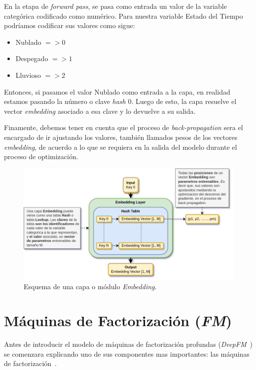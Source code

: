 \documentclass[11pt,a4paper,twoside]{thesis}
\begin{document}
\clearpage

En la etapa de \textit{forward pass}, se pasa como entrada un valor de la
variable categórica codificado como numérico. Para nuestra variable Estado del
Tiempo podríamos codificar sus valores como sigue:

\begin{itemize}
	\item Nublado $=> 0$
	\item Despegado $=> 1$
	\item Lluvioso $=> 2$
\end{itemize}

Entonces, si pasamos el valor Nublado como entrada a la capa, en realidad
estamos pasando la número o clave \textit{hash} $0$. Luego de esto, la capa
resuelve el vector \textit{embedding} asociado a esa clave y lo devuelve a su
salida.

Finamente, debemos tener en cuenta que el proceso de \textit{back-propagation}
sera el encargado de ir ajustando los valores, también llamados pesos de los
vectores \textit{embedding}, de acuerdo a lo que se requiera en la salida del
modelo durante el proceso de optimización.

\begin{figure}[ht!]
	\centering
	\includegraphics[width=13cm]{./images/Embedding-Layer.png}
	\caption{Esquema de una capa o módulo \textit{Embedding}.}
	\label{fig:embeddingLayer}
\end{figure}

\clearpage



\section{Máquinas de Factorización (\textit{FM})}

Antes de introducir el modelo de máquinas de factorización profundas
(\textit{DeepFM}~\cite{dfmpaper, didldfm}) se comenzara explicando uno de sus componentes mas
importantes: las máquinas de factorización~\cite{didlfm, zhangdive}.
\end{document}
